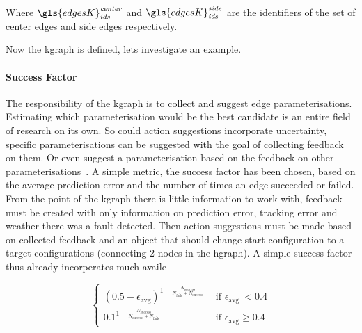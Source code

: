 Where $\gls{edgesK}^\mathit{center}_\mathit{ids}$ and $\gls{edgesK}^\mathit{side}_\mathit{ids}$ are the identifiers of the set of center edges and side edges respectively.\bs 

Now the \ac{kgraph} is defined, lets investigate an example.\bs

\paragraph{Success Factor} The responsibility of the \ac{kgraph} is to collect and suggest edge parameterisations. Estimating which parameterisation would be the best candidate is an entire field of research on its own. So could action suggestions incorporate uncertainty, specific  parameterisations can be suggested with the goal of collecting feedback on them. Or even suggest a parameterisation based on the feedback on other parameterisations~\cite{kopicki_learning_2017}. A simple metric, the success factor has been chosen, based on the average prediction error and the number of times an edge succeeded or failed. From the point of the \ac{kgraph} there is little information to work with, feedback must be created with only information on prediction error, tracking error and weather there was a fault detected. Then action suggestions must be made based on collected feedback and an object that should change start configuration to a target configurations (connecting 2 nodes in the \ac{hgraph}). A simple success factor thus already incorperates much availe


$$
\begin{cases} \left(0.5-\epsilon_{\textrm {avg}}\right)^{1-\frac{N_\textrm{success}}{N_\textrm{fails}+ N_\textrm{success}}} & \textrm { if } \epsilon_{\textrm {avg }}<0.4 \\ 0.1^{1-\frac{N_\textrm{success}}{N_\textrm{success}+N_\textrm{fails}}} & \textrm{ if } \epsilon_{\textrm{avg}} \geq 0.4 \end{cases}
$$


